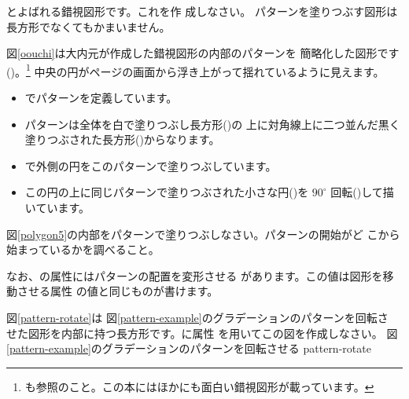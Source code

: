 {とよばれる錯視図形です。これを作
成しなさい。}
パターンを塗りつぶす図形は長方形でなくてもかまいません。

図\ref{oouchi}は大内元が作成した錯視図形の内部のパターンを
簡略化した図形です(\cite[74ページ図7.5]{Ninio})。\footnote{\cite[75ペー
ジ]{Ouchi}も参照のこと。この本にはほかにも面白い錯視図形が載っています。}
中央の円がページの画面から浮き上がって揺れているように見えます。

{}
\begin{itemize}
 \item {}でパターンを定義しています。
 \item パターンは全体を白で塗りつぶし長方形()の
       上に対角線上に二つ並んだ黒く塗りつぶされた長方形()からなります。
 \item {}で外側の円をこのパターンで塗りつぶしています。
 \item この円の上に同じパターンで塗りつぶされた小さな円()を
       $90^{\circ}$ 回転()して描
       いています。
\end{itemize}
\begin{Problem}\upshape
 図\ref{polygon5}の内部をパターンで塗りつぶしなさい。パターンの開始がど
 こから始まっているかを調べること。
\end{Problem}
なお、の属性にはパターンの配置を変形させる
があります。この値は図形を移動させる属性
の値と同じものが書けます。
\begin{Problem}\upshape\label{prob-pattern-rotate}
    図\ref{pattern-rotate}は
図\ref{pattern-example}のグラデーションのパターンを回転さ
せた図形を内部に持つ長方形です。に属性
 を用いてこの図を作成しなさい。
{図\ref{pattern-example}のグラデーションのパターンを回転させる}
{pattern-rotate} %
\end{Problem}
